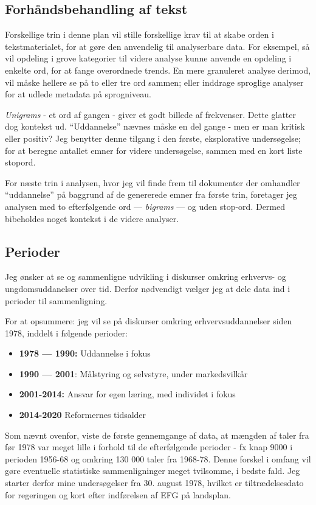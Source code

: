 \subsection{Forhåndsbehandling af tekst}

Forskellige trin i denne plan vil stille forskellige krav til at skabe orden i tekstmaterialet, for at gøre den anvendelig til analyserbare data.
For eksempel, så vil opdeling i grove kategorier til videre analyse kunne anvende en opdeling i enkelte ord, for at fange overordnede trends.
En mere granuleret analyse derimod, vil måske hellere se på to eller tre ord sammen; eller inddrage sproglige analyser for at udlede metadata på sprogniveau.

\textit{Unigrams} - et ord af gangen - giver et godt billede af frekvenser. 
Dette glatter dog kontekst ud.
“Uddannelse” nævnes måske en del gange - men er man kritisk eller positiv?
Jeg benytter denne tilgang i den første, eksplorative undersøgelse; for at beregne antallet emner for videre undersøgelse, sammen med en kort liste stopord.

For næste trin i analysen, hvor jeg vil finde frem til dokumenter der omhandler “uddannelse” på baggrund af de genererede emner fra første trin, foretager jeg analysen med to efterfølgende ord — \textit{bigrams} — og uden stop-ord.
Dermed bibeholdes noget kontekst i de videre analyser.


\subsection{Perioder}\label{sec:periods}
Jeg ønsker at se og sammenligne udvikling i diskurser omkring erhvervs- og ungdomsuddanelser over tid.
Derfor nødvendigt vælger jeg at dele data ind i perioder til sammenligning.

For at opsummere: jeg vil se på diskurser omkring erhvervsuddannelser siden 1978, inddelt i følgende perioder:

\begin{itemize}
  \item
    \textbf{1978 — 1990:} Uddannelse i fokus
  \item
    \textbf{1990 — 2001}: Målstyring og selvstyre, under markedsvilkår
  \item
    \textbf{2001-2014:} Ansvar for egen læring, med individet i fokus
  \item
    \textbf{2014-2020} Reformernes tidsalder
\end{itemize}

Som nævnt ovenfor, viste de første gennemgange af data, at mængden af taler fra før 1978 var meget lille i forhold til de efterfølgende perioder - fx knap 9000 i perioden 1956-68 og omkring 130 000 taler fra 1968-78.
Denne forskel i omfang vil gøre eventuelle statistiske sammenligninger meget tvilsomme, i bedste fald.
Jeg starter derfor mine undersøgelser fra 30. august 1978, hvilket er tiltrædelsesdato for regeringen og kort efter indførelsen af EFG på landsplan.

